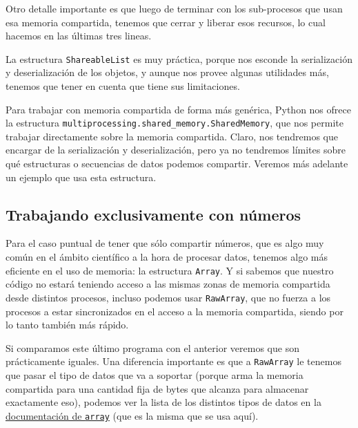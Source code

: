 Otro detalle importante es que luego de terminar con los sub-procesos que usan esa memoria compartida, tenemos que cerrar y liberar esos recursos, lo cual hacemos en las últimas tres lineas.


La estructura \texttt{ShareableList} es muy práctica, porque nos esconde la serialización y deserialización de los objetos, y aunque nos provee algunas utilidades más, tenemos que tener en cuenta que tiene sus limitaciones. 

Para trabajar con memoria compartida de forma más genérica, Python nos ofrece la estructura \texttt{multiprocessing.shared\_memory.SharedMemory}, que nos permite trabajar directamente sobre la memoria compartida. Claro, nos tendremos que encargar de la serialización y deserialización, pero ya no tendremos límites sobre qué estructuras o secuencias de datos podemos compartir. Veremos más adelante un ejemplo que usa esta estructura.


\subsection{Trabajando exclusivamente con números}

Para el caso puntual de tener que sólo compartir números, que es algo muy común en el ámbito científico a la hora de procesar datos, tenemos algo más eficiente en el uso de memoria: la estructura \texttt{Array}. Y si sabemos que nuestro código no estará teniendo acceso a las mismas zonas de memoria compartida desde distintos procesos, incluso podemos usar \texttt{RawArray}, que no fuerza a los procesos a estar sincronizados en el acceso a la memoria compartida, siendo por lo tanto también más rápido.


Si comparamos este último programa con el anterior veremos que son prácticamente iguales. Una diferencia importante es que a \texttt{RawArray} le tenemos que pasar el tipo de datos que va a soportar (porque arma la memoria compartida para una cantidad fija de bytes que alcanza para almacenar exactamente eso), podemos ver la lista de los distintos tipos de datos en la \href{https://docs.python.org/dev/library/array.html#module-array}{documentación de \texttt{array}} (que es la misma que se usa aquí).

